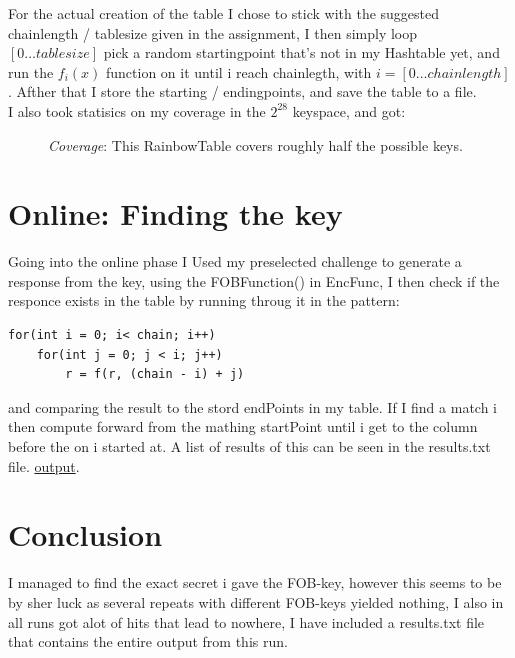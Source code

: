 For the actual creation of the table I chose to stick with the suggested
chainlength / tablesize given in the assignment, I then simply loop
$[0\dots tablesize]$ pick a random startingpoint that's not in my Hashtable yet,
and run the $f_i(x)$ function on it until i reach chainlegth, with $i =
[0\dots chainlength]$. Afther that I store the starting / endingpoints, and save
the table to a file.\\
I also took statisics on my coverage in the $2^{28}$ keyspace, and got:
\FloatBarrier
\begin{figure}[h]
\centering
{}
\caption{\emph{Coverage}: This RainbowTable covers roughly half the possible
keys.}
\label{fig:ClassDia}
\end{figure}
\FloatBarrier
\section*{Online: Finding the key}
Going into the online phase I Used my preselected challenge to generate a
response from the key, using the FOBFunction() in EncFunc, I then check if the
responce exists in the table by running throug it in the pattern:
\begin{lstlisting}
for(int i = 0; i< chain; i++)
	for(int j = 0; j < i; j++)
		r = f(r, (chain - i) + j)
\end{lstlisting}
and comparing the result to the stord endPoints in my table. If I find a match i
then compute forward from the mathing startPoint until i get to the column
before the on i started at. A list of results of this can be seen in the
results.txt file.
\hyperref[appendix]{output}.
\section*{Conclusion}
I managed to find the exact secret i gave the FOB-key, however this seems to be
by sher luck as several repeats with different FOB-keys yielded nothing, I also
in all runs got alot of hits that lead to nowhere, I have included a results.txt
file that contains the entire output from this run.
